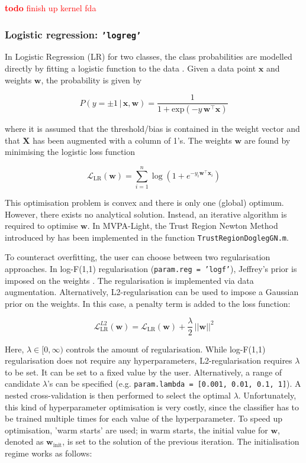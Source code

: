 \documentclass[utf8]{frontiersSCNS} %
\newcommand{\w}{\mathbf{w}}
\newcommand{\x}{\mathbf{x}}
\renewcommand{\L}{\mathcal{L}}
\newcommand{\X}{\mathbf{X}}
\newcommand{\mvpa}{MVPA-Light}
\newcommand{\ttt}[1]{\texttt{#1}}
\newcommand{\todo}[1]{\textcolor{red}{\textbf{todo} #1}}
\begin{document}
\todo{finish up kernel fda}

\subsubsection{Logistic regression: \ttt{'logreg'}}

In Logistic Regression (LR) for two classes, the class probabilities are modelled directly by fitting a logistic function to the data \citep{Hastie2009}. Given a data point $\x$ and weights $\w$, the probability is given by

\begin{equation}
\label{eq:logreg_probability}
P(y = \pm 1\,|\,\x,\w) = \frac{1}{1 + \text{exp}(-y\,\w^\top\x)}
\end{equation}

where it is assumed that the threshold/bias is contained in the weight vector and that $\X$ has been augmented with a column of 1's. The weights $\w$ are found by minimising the logistic loss function

\begin{equation}
\label{eq:logreg_loss_function}
\L_\text{LR}(\w) = \sum_{i=1}^n \log(1 + e^{-y_i\w^\top\x_i})
\end{equation}

This optimisation problem is convex and there is only one (global) optimum. However, there exists no analytical solution. Instead, an iterative algorithm is required to optimise $\w$. In \mvpa{}, the Trust Region Newton Method introduced by \cite{Lin2007TrustRegression} has been implemented in the function \ttt{TrustRegionDoglegGN.m}.

To counteract overfitting, the user can choose between two regularisation approaches. In log-F(1,1) regularisation (\ttt{param.reg = 'logf'}), Jeffrey's prior is imposed on the weights \citep{Firth1993BiasEstimates,Rahman2017PerformanceData.,King2001}. The regularisation is implemented via data augmentation. Alternatively, L2-regularisation can be used to impose a Gaussian prior on the weights. In this case, a penalty term is added to the loss function:

\begin{equation}
\label{eq:logreg_loss_function}
\L_\text{LR}^{L2}(\w) = \L_\text{LR}(\w) + \frac{\lambda}{2}\, ||\w||^2
\end{equation}

Here, $\lambda\in [0,\infty)$ controls the amount of regularisation. While log-F(1,1) regularisation does not require any hyperparameters, L2-regularisation requires $\lambda$ to be set. It can be set to a fixed value by the user. Alternatively, a range of candidate $\lambda$'s can be specified (e.g. \ttt{param.lambda = [0.001, 0.01, 0.1, 1]}). A nested cross-validation is then performed to select the optimal $\lambda$.
Unfortunately, this kind of hyperparameter optimisation is very costly, since the classifier has to be trained multiple times for each value of the hyperparameter. To speed up optimisation, 'warm starts' are used; in warm starts, the initial value for $\w$, denoted as  $\w_\text{init}$, is set to the solution of the previous iteration. The initialisation regime works as follows:
\end{document}
